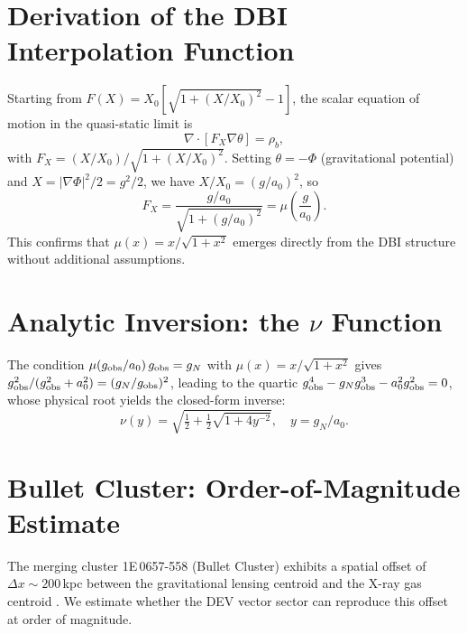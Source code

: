 \documentclass[aps,prd,twocolumn,showpacs,superscriptaddress]{revtex4-2}
\newcommand{\aO}{a_0}
\newcommand{\Xzero}{X_0}
\begin{document}
\appendix

\section{Derivation of the DBI Interpolation Function}
\label{app:DBI}

Starting from $F(X) = \Xzero[\sqrt{1+(X/\Xzero)^2}-1]$,
the scalar equation of motion in the quasi-static limit is
\begin{equation}
  \nabla\cdot[F_X\nabla\theta] = \rho_b,
\end{equation}
with $F_X = (X/\Xzero)/\sqrt{1+(X/\Xzero)^2}$.
Setting $\theta = -\Phi$ (gravitational potential) and
$X = |\nabla\Phi|^2/2 = g^2/2$, we have $X/\Xzero = (g/\aO)^2$, so
\begin{equation}
  F_X = \frac{g/\aO}{\sqrt{1+(g/\aO)^2}} = \mu\!\left(\frac{g}{\aO}\right).
\end{equation}
This confirms that $\mu(x) = x/\sqrt{1+x^2}$ emerges
directly from the DBI structure without additional assumptions.

\section{Analytic Inversion: the $\nu$ Function}
\label{app:nu}

The condition $\mu(g_{\rm obs}/\aO)\,g_{\rm obs} = g_N$
with $\mu(x) = x/\sqrt{1+x^2}$ gives
$g_{\rm obs}^2/(g_{\rm obs}^2 + \aO^2) = (g_N/g_{\rm obs})^2$,
leading to the quartic $g_{\rm obs}^4 - g_N g_{\rm obs}^3 - \aO^2 g_{\rm obs}^2 = 0$,
whose physical root yields the closed-form inverse:
\begin{equation}
  \nu(y) = \sqrt{\tfrac{1}{2} + \tfrac{1}{2}\sqrt{1+4y^{-2}}},
  \quad y = g_N/\aO.
\end{equation}

\section{Bullet Cluster: Order-of-Magnitude Estimate}
\label{app:bullet}

The merging cluster 1E\,0657-558 (Bullet Cluster) exhibits
a spatial offset of $\Delta x \sim 200$\,kpc between the
gravitational lensing centroid and the X-ray gas centroid
\cite{Clowe2006}. We estimate whether the DEV vector sector
can reproduce this offset at order of magnitude.
\end{document}
